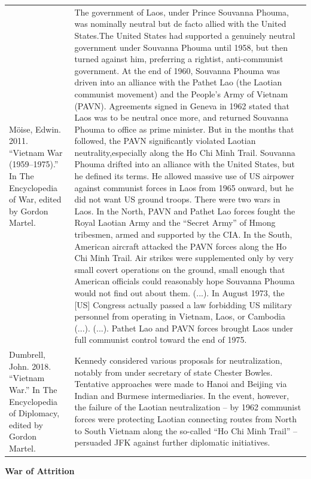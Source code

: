 {\begin{longtable}{p{}p{}}
\\
Möise, Edwin. 2011. “Vietnam War (1959–1975).” In The Encyclopedia of War, edited by Gordon Martel. & The government of Laos, under Prince Souvanna Phouma, was nominally neutral but de facto allied with the United States.The United States had supported a genuinely neutral government under Souvanna Phouma until 1958, but then turned against him, preferring a rightist, anti-communist government. At the end of 1960, Souvanna Phouma was driven into an alliance with the Pathet Lao (the Laotian communist movement) and the People's Army of Vietnam (PAVN). Agreements signed in Geneva in 1962 stated that Laos was to be neutral once more, and returned Souvanna Phouma to office as prime minister. But in the months that followed, the PAVN significantly violated Laotian neutrality,especially along the Ho Chi Minh Trail. Souvanna Phouma drifted into an alliance with the United States, but he defined its terms. He allowed massive use of US airpower against communist forces in Laos from 1965 onward, but he did not want US ground troops.
There were two wars in Laos. In the North, PAVN and Pathet Lao forces fought the Royal Laotian Army and the “Secret Army” of Hmong tribesmen, armed and supported by the CIA. In the South, American aircraft attacked the PAVN forces along the Ho Chi Minh Trail. Air strikes were supplemented only by very small covert operations on the ground, small enough that American officials could reasonably hope Souvanna Phouma would not find out about them. (...).
In August 1973, the [US] Congress actually passed a law forbidding US military personnel from operating in Vietnam, Laos, or Cambodia (...). (...).
Pathet Lao and PAVN forces brought Laos under full communist control toward the end of 1975.

\\
Dumbrell, John. 2018. “Vietnam War.” In The Encyclopedia of Diplomacy, edited by Gordon Martel. & Kennedy considered various proposals for neutralization, notably from under secretary of state Chester Bowles. Tentative approaches were made to Hanoi and Beijing via Indian and Burmese intermediaries. In the event, however, the failure of the Laotian neutralization – by 1962 communist forces were protecting Laotian connecting routes from North to South Vietnam along the so-called “Ho Chi Minh Trail” – persuaded JFK against further diplomatic initiatives.
\\
\end{longtable}}
\clearpage
         \textbf{War of Attrition} 

